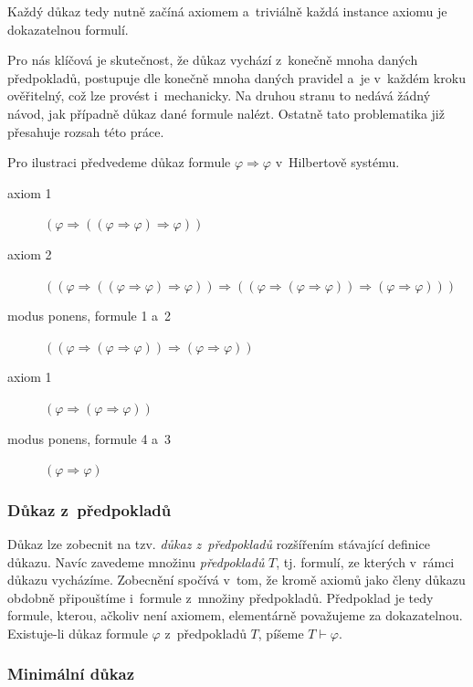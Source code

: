 \documentclass[thesis=B,czech,hidelinks]{thesis}[2012/06/26]
\begin{document}
Každý důkaz tedy nutně začíná axiomem a~triviálně každá instance axiomu je dokazatelnou formulí.

Pro nás klíčová je skutečnost, že důkaz vychází z~konečně mnoha daných předpokladů, postupuje dle konečně mnoha daných pravidel a~je v~každém kroku ověřitelný, což lze provést i~mechanicky\cite{stary}. Na druhou stranu to nedává žádný návod, jak případně důkaz dané formule nalézt. Ostatně tato problematika již přesahuje rozsah této práce.

\begin{exm}
\label{exm:proof_a>a}
Pro ilustraci předvedeme důkaz formule $\varphi \Rightarrow \varphi$ v~Hilbertově systému.
\begin{description}
	\item[axiom 1] $(\varphi \Rightarrow ((\varphi \Rightarrow \varphi) \Rightarrow \varphi))$
	\item[axiom 2] $((\varphi \Rightarrow ((\varphi \Rightarrow \varphi) \Rightarrow \varphi)) \Rightarrow ((\varphi \Rightarrow (\varphi \Rightarrow \varphi)) \Rightarrow (\varphi \Rightarrow \varphi)))$
	\item[modus ponens, formule 1 a~2] $((\varphi \Rightarrow (\varphi \Rightarrow \varphi)) \Rightarrow (\varphi \Rightarrow \varphi))$
	\item[axiom 1] $(\varphi \Rightarrow (\varphi \Rightarrow \varphi))$
	\item[modus ponens, formule 4 a~3] $(\varphi \Rightarrow \varphi)$
\end{description}
\end{exm}

\subsubsection{Důkaz z~předpokladů}

Důkaz lze zobecnit na tzv. \emph{důkaz z~předpokladů} rozšířením stávající definice důkazu. Navíc zavedeme množinu \emph{předpokladů} $T$, tj. formulí, ze kterých v~rámci důkazu vycházíme. Zobecnění spočívá v~tom, že kromě axiomů jako členy důkazu obdobně připouštíme i~formule z~množiny předpokladů. Předpoklad je tedy formule, kterou, ačkoliv není axiomem, elementárně považujeme za dokazatelnou. Existuje-li důkaz formule $\varphi$ z~předpokladů $T$, píšeme $T \vdash \varphi$.

\subsubsection{Minimální důkaz}
\end{document}
